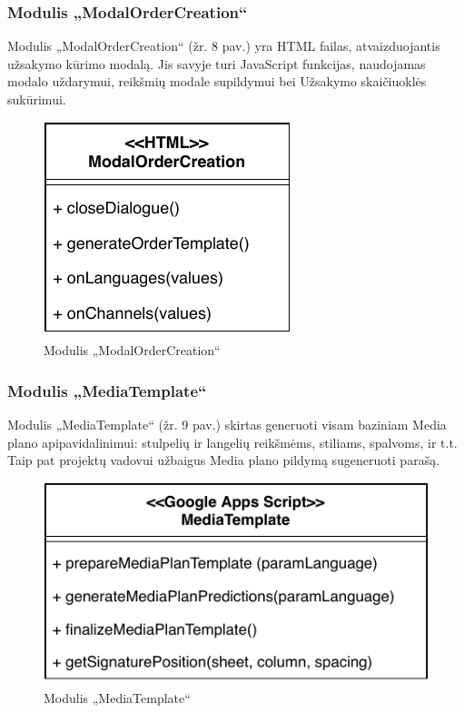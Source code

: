 \subsubsection{Modulis „ModalOrderCreation“}
Modulis „ModalOrderCreation“ (žr. 8 pav.) yra HTML failas, atvaizduojantis užsakymo kūrimo modalą. Jis savyje turi JavaScript funkcijas, naudojamas modalo uždarymui, reikšmių modale supildymui bei Užsakymo skaičiuoklės sukūrimui.

\begin{figure}[H]
    \centering
    \includegraphics[scale=0.8]{Images/module-modal-order-creation.pdf}
    \caption{Modulis „ModalOrderCreation“}
    \label{img:model}
\end{figure}

\subsubsection{Modulis „MediaTemplate“}
Modulis „MediaTemplate“ (žr. 9 pav.) skirtas generuoti visam baziniam Media plano apipavidalinimui: stulpelių ir langelių reikšmėms, stiliams, spalvoms, ir t.t. Taip pat projektų vadovui užbaigus Media plano pildymą sugeneruoti parašą.

\begin{figure}[H]
    \centering
    \includegraphics[scale=0.8]{Images/module-media-template.pdf}
    \caption{Modulis „MediaTemplate“}
    \label{img:model}
\end{figure}

